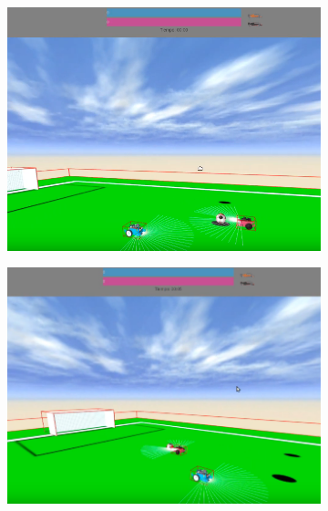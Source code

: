 \begin{figure}[h!]
  \begin{subfigure}[b]{0.5\textwidth}
    \includegraphics[width=\textwidth, height=\textwidth]{evaluador1.png}
  \end{subfigure}
  \hfill
  \hfill
  \begin{subfigure}[b]{0.5\textwidth}
    \includegraphics[width=\textwidth, height=\textwidth]{evaluador2.png}

\end{subfigure}
\end{figure}
